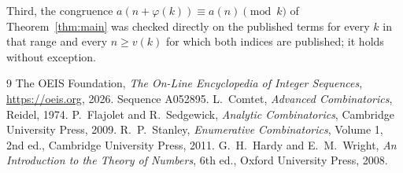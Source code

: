 \documentclass[11pt,a4paper]{article}
\theoremstyle{plain}
\theoremstyle{definition}
\begin{document}
Third, the congruence $a(n+\varphi(k))\equiv a(n)\pmod k$ of Theorem~\ref{thm:main} was
checked directly on the published terms for every $k$ in that range and every $n\ge v(k)$
for which both indices are published; it holds without exception.

\begin{thebibliography}{9}
 The OEIS Foundation, \emph{The On-Line Encyclopedia of Integer
Sequences}, \url{https://oeis.org}, 2026. Sequence A052895.
 L.~Comtet, \emph{Advanced Combinatorics}, Reidel, 1974.
 P.~Flajolet and R.~Sedgewick, \emph{Analytic Combinatorics}, Cambridge
University Press, 2009.
 R.~P.~Stanley, \emph{Enumerative Combinatorics}, Volume 1, 2nd ed.,
Cambridge University Press, 2011.
 G.~H.~Hardy and E.~M.~Wright, \emph{An Introduction to the Theory of
Numbers}, 6th ed., Oxford University Press, 2008.
\end{thebibliography}
\end{document}
